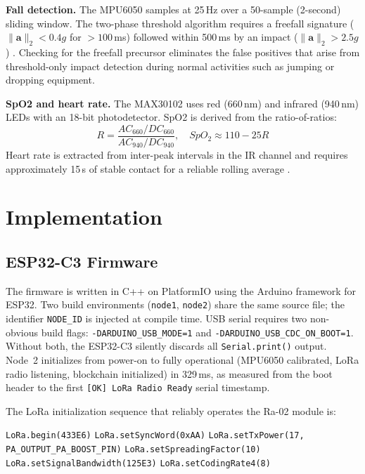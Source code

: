 \documentclass[journal]{IEEEtran}
\begin{document}
\textbf{Fall detection.} The MPU6050 samples at 25\,Hz over a 50-sample
(2-second) sliding window. The two-phase threshold algorithm requires a
freefall signature ($\|\mathbf{a}\|_2 < 0.4g$ for $> 100$\,ms) followed
within 500\,ms by an impact ($\|\mathbf{a}\|_2 > 2.5g$)
\cite{Bourke2006}. Checking for the freefall precursor eliminates the
false positives that arise from threshold-only impact detection during
normal activities such as jumping or dropping equipment.

\textbf{SpO2 and heart rate.} The MAX30102 uses red (660\,nm) and
infrared (940\,nm) LEDs with an 18-bit photodetector. SpO2 is derived
from the ratio-of-ratios:
\begin{equation}
R = \frac{AC_{660}/DC_{660}}{AC_{940}/DC_{940}}, \quad
SpO_2 \approx 110 - 25R
\label{eq:spo2}
\end{equation}
Heart rate is extracted from inter-peak intervals in the IR channel and
requires approximately 15\,s of stable contact for a reliable rolling
average \cite{Nho2020}.

\section{Implementation}
\label{sec:impl}

\subsection{ESP32-C3 Firmware}

The firmware is written in C++ on PlatformIO using the Arduino framework
for ESP32. Two build environments (\texttt{node1}, \texttt{node2}) share
the same source file; the identifier \texttt{NODE\_ID} is injected at
compile time. USB serial requires two non-obvious build flags:
\texttt{-DARDUINO\_USB\_MODE=1} and
\texttt{-DARDUINO\_USB\_CDC\_ON\_BOOT=1}. Without both, the ESP32-C3
silently discards all \texttt{Serial.print()} output. Node~2 initializes
from power-on to fully operational (MPU6050 calibrated, LoRa radio
listening, blockchain initialized) in 329\,ms, as measured from the boot
header to the first \texttt{[OK] LoRa Radio Ready} serial timestamp.

The LoRa initialization sequence that reliably operates the Ra-02 module
is:
\begin{algorithmic}[1]
\STATE \texttt{LoRa.begin(433E6)}
\STATE \texttt{LoRa.setSyncWord(0xAA)}
\STATE \texttt{LoRa.setTxPower(17, PA\_OUTPUT\_PA\_BOOST\_PIN)}
\STATE \texttt{LoRa.setSpreadingFactor(10)}
\STATE \texttt{LoRa.setSignalBandwidth(125E3)}
\STATE \texttt{LoRa.setCodingRate4(8)}
\end{algorithmic}
\end{document}
